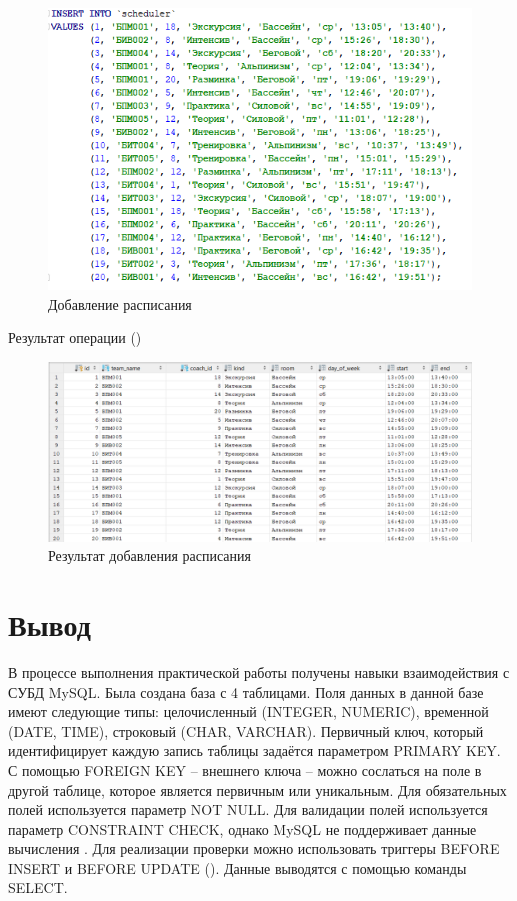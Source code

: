 \documentclass[a4paper,14pt]{article}
\begin{document}
	\begin{figure}[H]
		\centering		
		\includegraphics[width=\linewidth]{image/insertScheduler}
		\caption{Добавление расписания}\label{img:insertScheduler}
	\end{figure} 
	
	Результат операции ()
	
	\begin{figure}[H]
		\centering		
		\includegraphics[width=\linewidth]{image/selectScheduler}
		\caption{Результат добавления расписания}\label{img:selectScheduler}
	\end{figure}
 
\section{Вывод}

В процессе выполнения практической работы получены навыки взаимодействия с СУБД MySQL. 
Была создана база с 4 таблицами. 
Поля данных в данной базе имеют следующие типы: целочисленный (INTEGER, NUMERIC), временной (DATE, TIME), строковый (CHAR, VARCHAR).
Первичный ключ, который идентифицирует каждую запись таблицы задаётся параметром PRIMARY KEY.
С помощью FOREIGN KEY -- внешнего ключа -- можно сослаться на поле в другой таблице, которое является первичным или уникальным.
Для обязательных полей используется параметр NOT NULL.
Для валидации полей используется параметр CONSTRAINT CHECK, однако MySQL не поддерживает данные вычисления \cite{sql}.
Для реализации проверки можно использовать триггеры BEFORE INSERT и BEFORE UPDATE ().
Данные выводятся с помощью команды SELECT.
\end{document}
